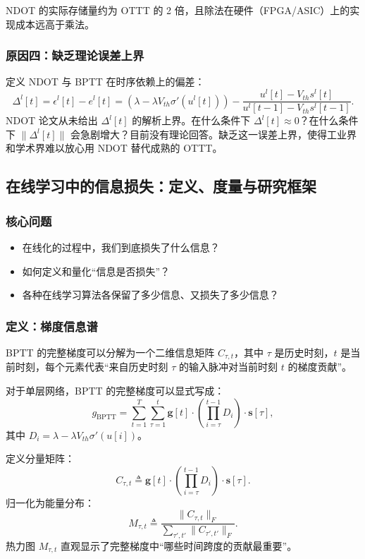 \documentclass[journal,12pt,onecolumn]{IEEEtran}
\begin{document}
NDOT 的实际存储量约为 OTTT 的 2 倍，且除法在硬件（FPGA/ASIC）上的实现成本远高于乘法。

\subsubsection{原因四：缺乏理论误差上界}

定义 NDOT 与 BPTT 在时序依赖上的偏差：
\[
\Delta^l[t] = \epsilon^l[t] - e^l[t]
= \left( \lambda - \lambda V_{th}\sigma'(u^l[t]) \right)
- \frac{u^l[t] - V_{th}s^l[t]}{u^l[t-1] - V_{th}s^l[t-1]}.
\]
NDOT 论文从未给出 \(\Delta^l[t]\) 的解析上界。在什么条件下 \(\Delta^l[t] \approx 0\)？在什么条件下 \(\|\Delta^l[t]\|\) 会急剧增大？目前没有理论回答。缺乏这一误差上界，使得工业界和学术界难以放心用 NDOT 替代成熟的 OTTT。

\subsection{在线学习中的信息损失：定义、度量与研究框架}

\subsubsection{核心问题}

\begin{itemize}
    \item 在线化的过程中，我们到底损失了什么信息？
    \item 如何定义和量化“信息是否损失”？
    \item 各种在线学习算法各保留了多少信息、又损失了多少信息？
\end{itemize}

\subsubsection{定义：梯度信息谱}

BPTT 的完整梯度可以分解为一个二维信息矩阵 \(C_{\tau,t}\)，其中 \(\tau\) 是历史时刻，\(t\) 是当前时刻，每个元素代表“来自历史时刻 \(\tau\) 的输入脉冲对当前时刻 \(t\) 的梯度贡献”。

对于单层网络，BPTT 的完整梯度可以显式写成：
\[
g_{\text{BPTT}} = \sum_{t=1}^T \sum_{\tau=1}^t \mathbf{g}[t] \cdot
\left( \prod_{i=\tau}^{t-1} D_i \right) \cdot \mathbf{s}[\tau],
\]
其中 \(D_i = \lambda - \lambda V_{th}\sigma'(u[i])\)。

定义分量矩阵：
\[
C_{\tau,t} \triangleq \mathbf{g}[t] \cdot
\left( \prod_{i=\tau}^{t-1} D_i \right) \cdot \mathbf{s}[\tau].
\]
归一化为能量分布：
\[
M_{\tau,t} \triangleq \frac{\|C_{\tau,t}\|_F}{\sum_{\tau',t'} \|C_{\tau',t'}\|_F}.
\]
热力图 \(M_{\tau,t}\) 直观显示了完整梯度中“哪些时间跨度的贡献最重要”。
\end{document}
